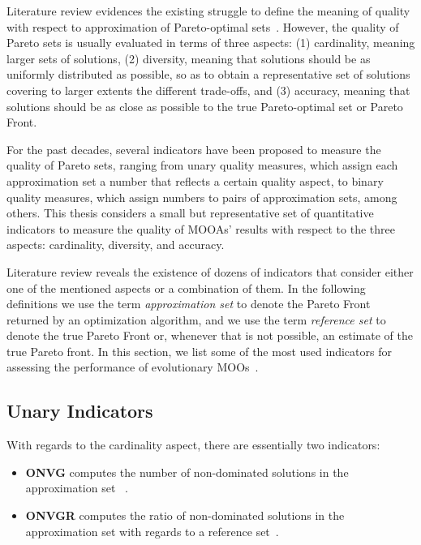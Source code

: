 Literature review evidences the existing struggle to define the meaning of quality with respect to approximation of Pareto-optimal sets~\cite{Knowles2002Metrics,Riquelme2015}. However, the quality of Pareto sets is usually evaluated in terms of three aspects: (1) cardinality, meaning larger sets of solutions, (2) diversity, meaning that solutions should be as uniformly distributed as possible, so as to obtain a representative set of solutions covering to larger extents the different trade-offs, and (3) accuracy, meaning that solutions should be as close as possible to the true Pareto-optimal set or Pareto Front. 

For the past decades, several indicators have been proposed to measure the quality of Pareto sets, ranging from unary quality measures, which assign each approximation set a number that reflects a certain quality aspect, to binary quality measures, which assign numbers to pairs of approximation sets, among others. This thesis considers a small but representative set of quantitative indicators to measure the quality of \acp{MOOA}' results with respect to the three aspects: cardinality, diversity, and accuracy. 

Literature review reveals the existence of dozens of indicators that consider either one of the mentioned aspects or a combination of them. In the following definitions we use the term \textit{approximation set} to denote the Pareto Front returned by an optimization algorithm, and we use the term \textit{reference set} to denote the true Pareto Front or, whenever that is not possible, an estimate of the true Pareto front. 
In this section, we list some of the most used indicators for assessing the performance of evolutionary \acp{MOO}~\cite{Riquelme2015}. 

\subsection{Unary Indicators}
With regards to the cardinality aspect, there are essentially two indicators:
\begin{itemize}
\item \textbf{\ac{ONVG}} computes the number of non-dominated solutions in the approximation set ~\cite{Veldhuizen1999GD}.
\item \textbf{\ac{ONVGR}} computes the ratio of non-dominated solutions in the approximation set with regards to a reference set~\cite{Veldhuizen1999GD}.
\end{itemize}

